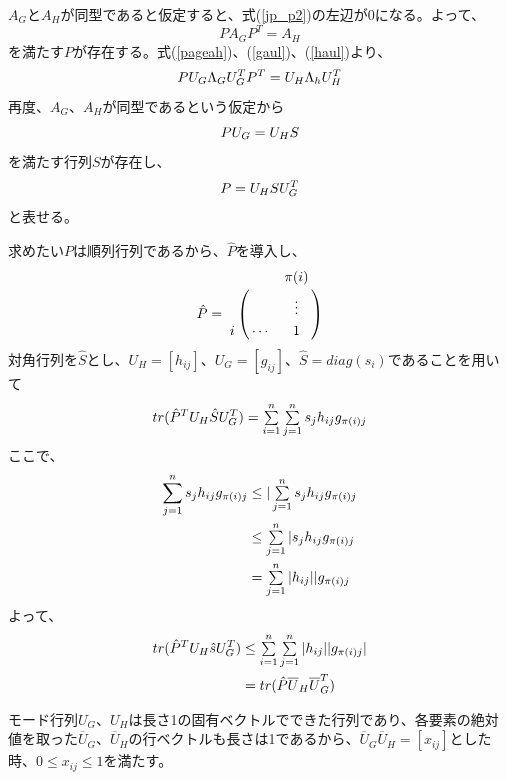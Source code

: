 $A_G$と$A_H$が同型であると仮定すると、式(\ref{jp_p2})の左辺が0になる。よって、
\begin{equation}
  \label{pageah}
  PA_GP^T=A_H
\end{equation}
を満たす$P$が存在する。式(\ref{pageah})、(\ref{gaul})、(\ref{haul})より、
\begin{equation}
  PU_G\Lambda_GU_G^TP^T=U_H\Lambda_hU_H^T \notag
\end{equation}
再度、$A_G$、$A_H$が同型であるという仮定から
\begin{equation}
  PU_G=U_HS \notag
\end{equation}
を満たす行列$S$が存在し、
\begin{equation}
  P=U_HSU_G^T \notag
\end{equation}
と表せる。

求めたい$P$は順列行列であるから、$\hat{P}$を導入し、
\begin{eqnarray}
  \hat{P}=\bordermatrix{  & & \pi(i) \cr
                    & & \vdots \cr
                  i & \cdots & 1 \cr
                  } \notag
\end{eqnarray}
対角行列を$\hat{S}$とし、$U_H=[h_{ij}]$、$U_G=[g_{ij}]$、$\hat{S}=diag(s_i)$であることを用いて
\begin{equation}
  tr(\hat{P}^TU_H\hat{S}U_G^T)=\textstyle\sum\limits_{i=1}^{n}\textstyle\sum\limits_{j=1}^{n}s_jh_{ij}g_{\pi(i)j} \notag
\end{equation}
ここで、
\begin{equation}
  \begin{split}
  \sum_{j=1}^{n}s_jh_{ij}g_{\pi(i)j}&\le|\textstyle\sum\limits_{j=1}^{n}s_jh_{ij}g_{\pi(i)j} \notag \\
                                    &\le\textstyle\sum\limits_{j=1}^{n}|s_jh_{ij}g_{\pi(i)j} \notag \\
                                    &=\textstyle\sum\limits_{j=1}^{n}|h_{ij}||g_{\pi(i)j} \notag
  \end{split}
\end{equation}
よって、
\begin{equation}
  \begin{split}
    tr(\hat{P}^TU_H\hat{s}U_G^T)&\le\textstyle\sum\limits_{i=1}^{n}\textstyle\sum\limits_{j=1}^{n}|h_{ij}||g_{\pi(i)j}| \notag \\
          &=tr(\hat{P}\overline{U}_H\overline{U}_G^T) \notag
  \end{split}
\end{equation}

モード行列$U_G$、$U_H$は長さ1の固有ベクトルでできた行列であり、各要素の絶対値を取った$\overline{U}_G$、$\overline{U}_H$の行ベクトルも長さは1であるから、$\overline{U}_G\overline{U}_H=[x_{ij}]$とした時、$0\le x_{ij}\le1$を満たす。

